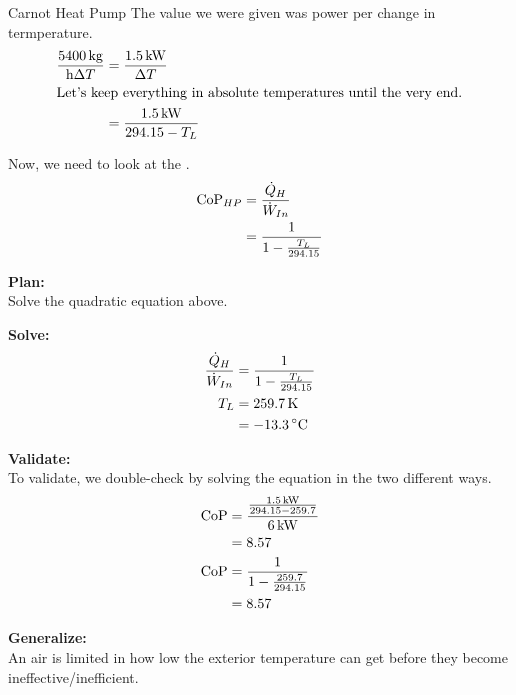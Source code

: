 \begin{example}{Carnot Heat Pump}
  The value we were given was power per change in termperature.
  \begin{align*}
    \frac{\SI{5400}{\kilo\gram}}{\si{\hour} \Delta T} &= \frac{\SI{1.5}{\kilo\watt}}{\Delta T} \\
    \intertext{Let's keep everything in absolute temperatures until the very end.}
    &= \frac{\SI{1.5}{\kilo\watt}}{294.15 - T_{L}}
  \end{align*}

  Now, we need to look at the .
  \begin{align*}
    \text{CoP}_{HP} &= \frac{\dot{Q}_{H}}{\dot{W}_{In}} \\
              &= \frac{1}{1 - \frac{T_{L}}{294.15}}
  \end{align*}

  \textbf{Plan:} \\
  Solve the  quadratic equation above.

  \textbf{Solve:} \\
  \begin{align*}
    \frac{\FlowRate{\Heat}_{H}}{\FlowRate{\Work}_{In}} &= \frac{1}{1 - \frac{\Temp_{L}}{294.15}} \\
    \Temp_{L} &= \SI{259.7}{\kelvin} \\
                                                       &= \SI{-13.3}{\degreeCelsius}
  \end{align*}

  \textbf{Validate:} \\
  To validate, we double-check by solving the  equation in the two different ways.
  \begin{align*}
    \text{CoP} &= \frac{\frac{\SI{1.5}{\kilo\watt}}{294.15 - 259.7}}{\SI{6}{\kilo\watt}} \\
         &= 8.57 \\
    \text{CoP} &= \frac{1}{1 - \frac{259.7}{294.15}} \\
         &= 8.57
  \end{align*}

  \textbf{Generalize:} \\
  An air  is limited in how low the exterior temperature can get before they become ineffective/inefficient.
\end{example}


